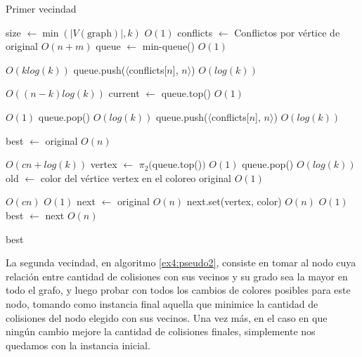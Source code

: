 \documentclass{article}
\theoremstyle{definition}
\theoremstyle{remark}
\begin{document}
\begin{algorithm}
\caption{Primer vecindad}
\label{ex4:pseudo2}

\begin{algorithmic}
    \State size $\gets \min(|V(\text{graph})|, k)$ \Comment $O(1)$
    \State conflicts $\gets$ Conflictos por vértice de original \Comment $O(n + m)$
    \State queue $\gets$ min-queue() \Comment $O(1)$
    
     \Comment $O(k log(k))$
        \State queue.push($\langle$conflicts[$n$], $ n\rangle$) \Comment $O(log(k))$
    \EndFor
    
     \Comment $O((n - k) log(k))$
        \State current $\gets$ queue.top() \Comment $O(1)$
        
         \Comment $O(1)$
            \State queue.pop() \Comment $O(log(k))$
            \State queue.push($\langle$conflicts[$n$], $ n\rangle$) \Comment $O(log(k))$
        \EndIf
    \EndFor
    
    \State best $\gets$ original \Comment $O(n)$
    
     \Comment $O(cn + log(k))$
        \State vertex $\gets$ $\pi_2($queue.top()$)$ \Comment $O(1)$
        \State queue.pop() \Comment $O(log(k))$
        \State old $\gets$ color del vértice vertex en el coloreo original \Comment $O(1)$
        
         \Comment $O(cn)$
             \Comment $O(1)$
                \State next $\gets$ original \Comment $O(n)$
                \State next.set(vertex, color) \Comment $O(n)$
                 \Comment $O(1)$
                    \State best $\gets$ next \Comment $O(n)$
                \EndIf
            \EndIf
        \EndFor
    \EndFor
    
    \Return best
\EndFunction
\end{algorithmic}
\end{algorithm}

La segunda vecindad, en algoritmo \ref{ex4:pseudo2}, consiste en tomar al nodo cuya relación entre cantidad de colisiones con sus vecinos y su grado sea la mayor en todo el grafo, y luego probar con todos los cambios de colores posibles para este nodo, tomando como instancia final aquella que minimice la cantidad de colisiones del nodo elegido con sus vecinos. Una vez más, en el caso en que ningún cambio mejore la cantidad de colisiones finales, simplemente nos quedamos con la instancia inicial.
\end{document}
